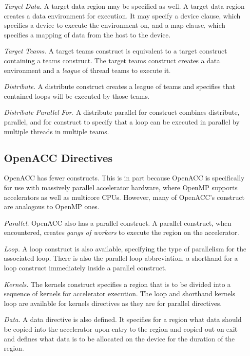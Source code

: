\documentclass{sig-alternate-05-2015}
\begin{document}
\emph{Target Data.}
A target data region may be specified as well. A target data region creates a
data environment for execution. It may specify a device clause, which specifies
a device to execute the environment on, and a map clause, which specifies a
mapping of data from the host to the device. 

\emph{Target Teams.}
A target teams construct is equivalent to a target construct containing a teams
construct. The target teams construct creates a data environment and a
\emph{league} of thread teams to execute it. 

\emph{Distribute.}
A distribute construct creates a league of teams and specifies that contained
loops will be executed by those teams. 

\emph{Distribute Parallel For.}
A distribute parallel for construct combines distribute, parallel, and for
construct to specify that a loop can be executed in parallel by multiple
threads in multiple teams. 

\subsection{OpenACC Directives}

OpenACC has fewer constructs. This is in part because OpenACC is specifically
for use with massively parallel accelerator hardware, where OpenMP supports
accelerators as well as multicore CPUs. %
However, many of OpenACC's construct are analogous to OpenMP ones. 

\emph{Parallel.}
OpenACC also has a parallel construct. A parallel construct, when encountered,
creates \emph{gangs of workers} to execute the region on the accelerator.

\emph{Loop.}
A loop construct is also available, specifying the type of parallelism for the
associated loop. There is also the parallel loop abbreviation, a shorthand for
a loop construct immediately inside a parallel construct. 

\emph{Kernels.}
The kernels construct specifies a region that is to be divided into a sequence
of kernels for accelerator execution. The loop and shorthand kernels loop are
available for kernels directives as they are for parallel directives. 

\emph{Data.}
A data directive is also defined. It specifies for a region what data should be
copied into the accelerator upon entry to the region and copied out on exit and
defines what data is to be allocated on the device for the duration of the
region. %
\end{document}
